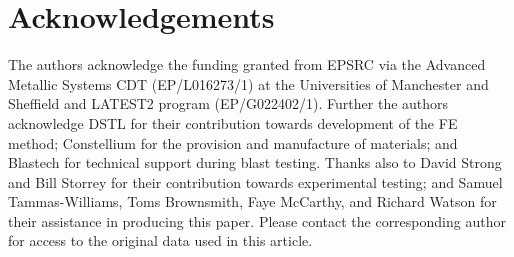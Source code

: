 
\section*{Acknowledgements}
\label{Acknowledgements}
The authors acknowledge the funding granted from EPSRC via the Advanced Metallic Systems CDT (EP/L016273/1) at the Universities of Manchester and Sheffield and LATEST2 program (EP/G022402/1). Further the authors acknowledge DSTL for their contribution towards development of the FE method; Constellium for the provision and manufacture of materials; and Blastech for technical support during blast testing. Thanks also to David Strong and Bill Storrey for their contribution towards experimental testing; and Samuel Tammas-Williams, Toms Brownsmith, Faye McCarthy, and Richard Watson for their assistance in producing this paper. Please contact the corresponding author for access to the original data used in this article.




